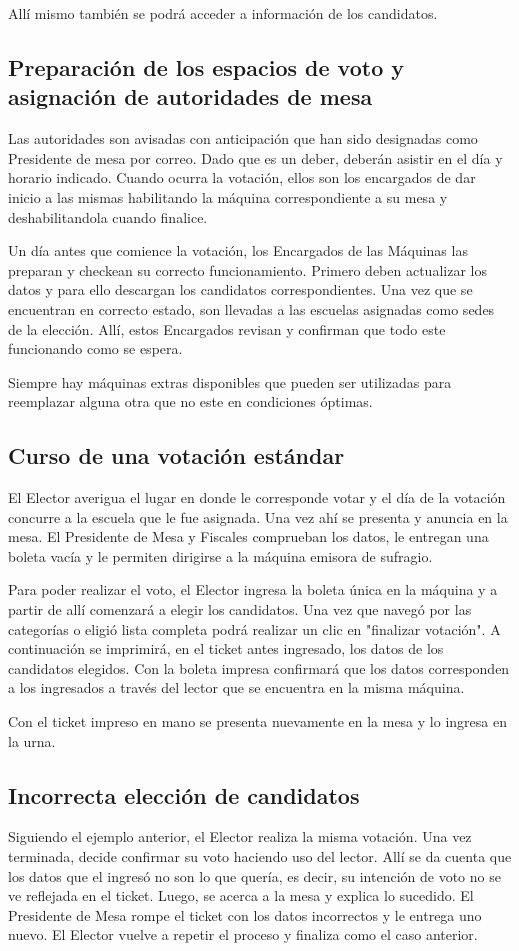 \documentclass[spanish, 10pt,a4paper]{article}
\numberwithin{equation}{section} %
\begin{document}
	Allí mismo también se podrá acceder a información de los candidatos.

\subsection{Preparación de los espacios de voto y asignación de autoridades de mesa}
	Las autoridades son avisadas con anticipación que han sido designadas como Presidente de mesa por correo. Dado que es un deber, deberán asistir en el día y horario indicado. Cuando ocurra la votación, ellos son los encargados de dar inicio a las mismas habilitando la máquina correspondiente a su mesa y deshabilitandola cuando finalice.		
	
	Un día antes que comience la votación, los Encargados de las Máquinas las preparan y checkean su correcto funcionamiento. Primero deben actualizar los datos y para ello descargan los candidatos correspondientes. Una vez que se encuentran en correcto estado, son llevadas a las escuelas asignadas como sedes de la elección. Allí, estos Encargados revisan y confirman que todo este funcionando como se espera. 
	
	Siempre hay máquinas extras disponibles que pueden ser utilizadas para reemplazar alguna otra que no este en condiciones óptimas.
	

\subsection{Curso de una votación estándar}
	El Elector averigua el lugar en donde le corresponde votar y el día de la votación concurre a la escuela que le fue asignada. Una vez ahí se presenta y anuncia en la mesa. El Presidente de Mesa y Fiscales comprueban los datos, le entregan una boleta vacía y le permiten dirigirse a la máquina emisora de sufragio. 

	Para poder realizar el voto, el Elector ingresa la boleta única en la máquina y a partir de allí comenzará a elegir los candidatos. Una vez que navegó por las categorías o eligió lista completa podrá  realizar un clic en "finalizar votación". A continuación se imprimirá, en el ticket antes ingresado, los datos de los candidatos elegidos. Con la boleta impresa confirmará que los datos corresponden a los ingresados a través del lector que se encuentra en la misma máquina.

	Con el ticket impreso en mano se presenta nuevamente en la mesa y lo ingresa en la urna.	
	
\subsection{Incorrecta elección de candidatos}
	Siguiendo el ejemplo anterior, el Elector realiza la misma votación. Una vez terminada, decide confirmar su voto haciendo uso del lector. Allí se da cuenta que los datos que el ingresó no son lo que quería, es decir, su intención de voto no se ve reflejada en el ticket. Luego, se acerca a la mesa y explica lo sucedido. El Presidente de Mesa rompe el ticket con los datos incorrectos y le entrega uno nuevo. El Elector vuelve a repetir el proceso y finaliza como el caso anterior. 
\end{document}
